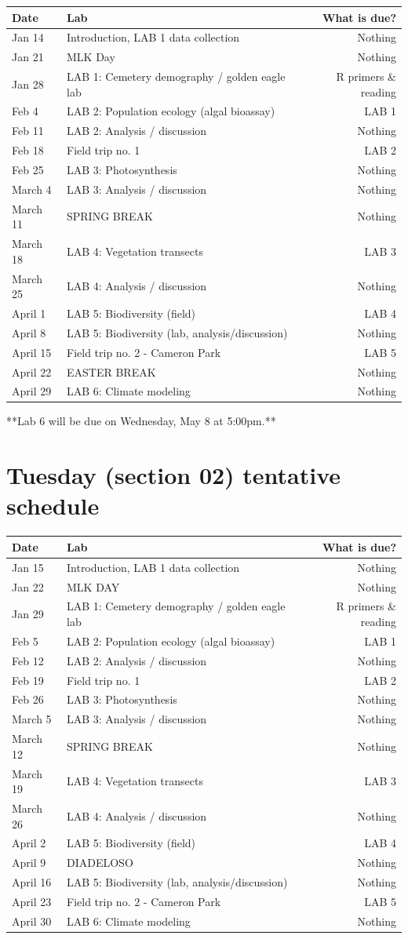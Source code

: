 \documentclass[11pt,]{article}
\begin{document}
\begin{longtable}[]{@{}llr@{}}
\toprule
Date & Lab & What is due?\tabularnewline
\midrule
\endhead
Jan 14 & Introduction, LAB 1 data collection & Nothing\tabularnewline
Jan 21 & MLK Day & Nothing\tabularnewline
Jan 28 & LAB 1: Cemetery demography / golden eagle lab & R primers \&
reading\tabularnewline
Feb 4 & LAB 2: Population ecology (algal bioassay) & LAB
1\tabularnewline
Feb 11 & LAB 2: Analysis / discussion & Nothing\tabularnewline
Feb 18 & Field trip no. 1 & LAB 2\tabularnewline
Feb 25 & LAB 3: Photosynthesis & Nothing\tabularnewline
March 4 & LAB 3: Analysis / discussion & Nothing\tabularnewline
March 11 & SPRING BREAK & Nothing\tabularnewline
March 18 & LAB 4: Vegetation transects & LAB 3\tabularnewline
March 25 & LAB 4: Analysis / discussion & Nothing\tabularnewline
April 1 & LAB 5: Biodiversity (field) & LAB 4\tabularnewline
April 8 & LAB 5: Biodiversity (lab, analysis/discussion) &
Nothing\tabularnewline
April 15 & Field trip no. 2 - Cameron Park & LAB 5\tabularnewline
April 22 & EASTER BREAK & Nothing\tabularnewline
April 29 & LAB 6: Climate modeling & Nothing\tabularnewline
\bottomrule
\end{longtable}

\begin{flushright}

**Lab 6 will be due on Wednesday, May 8 at 5:00pm.**

\end{flushright}

\hypertarget{tuesday-section-02-tentative-schedule}{%
\section{Tuesday (section 02) tentative
schedule}\label{tuesday-section-02-tentative-schedule}}

\begin{longtable}[]{@{}llr@{}}
\toprule
Date & Lab & What is due?\tabularnewline
\midrule
\endhead
Jan 15 & Introduction, LAB 1 data collection & Nothing\tabularnewline
Jan 22 & MLK DAY & Nothing\tabularnewline
Jan 29 & LAB 1: Cemetery demography / golden eagle lab & R primers \&
reading\tabularnewline
Feb 5 & LAB 2: Population ecology (algal bioassay) & LAB
1\tabularnewline
Feb 12 & LAB 2: Analysis / discussion & Nothing\tabularnewline
Feb 19 & Field trip no. 1 & LAB 2\tabularnewline
Feb 26 & LAB 3: Photosynthesis & Nothing\tabularnewline
March 5 & LAB 3: Analysis / discussion & Nothing\tabularnewline
March 12 & SPRING BREAK & Nothing\tabularnewline
March 19 & LAB 4: Vegetation transects & LAB 3\tabularnewline
March 26 & LAB 4: Analysis / discussion & Nothing\tabularnewline
April 2 & LAB 5: Biodiversity (field) & LAB 4\tabularnewline
April 9 & DIADELOSO & Nothing\tabularnewline
April 16 & LAB 5: Biodiversity (lab, analysis/discussion) &
Nothing\tabularnewline
April 23 & Field trip no. 2 - Cameron Park & LAB 5\tabularnewline
April 30 & LAB 6: Climate modeling & Nothing\tabularnewline
\bottomrule
\end{longtable}
\end{document}
